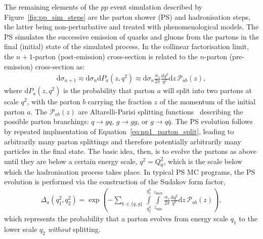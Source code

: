 The remaining elements of the $pp$ event simulation described by Figure~\ref{fig:pp_sim_steps} are the parton shower (PS)
and hadronisation steps, the latter being non-perturbative and treated with phenomenological models.
The PS simulates the successive emission of quarks and gluons from the partons in the final (initial) state of the
simulated process.
In the collinear factorisation limit, the $n+1$-parton (post-emission) cross-section is related to the $n$-parton (pre-emission) cross-section
as:
\begin{align}
    \mathrm{d}\sigma_{n+1} \approx \mathrm{d}\sigma_n \mathrm{d}P_a(z, q^2) \approx \mathrm{d}\sigma_n \frac{\alpha_s}{2\pi} \frac{\mathrm{d}q^2}{q^2} \mathrm{d}z \, \mathcal{P}_{ab}(z),
    \label{eq:np1_parton_split}
\end{align}
where $\mathrm{d}P_a(z,q^2)$ is the probability that parton $a$ will split into two partons at scale $q^2$, with the parton $b$ carrying the
fraction $z$ of the momentum of the initial parton $a$.
The $\mathcal{P}_{ab}(z)$ are Altarelli-Parisi splitting functions~\cite{Altarelli:1977zs} describing the possible parton branchings: $q \rightarrow gq$, $g \rightarrow gg$, 
or $g \rightarrow q\bar{q}$.
The PS evolution follows by repeated implmentation of Equation~\ref{eq:np1_parton_split}, leading to arbitrarily many
parton splittings and therefore potentially arbitrarily many particles in the final state.
The basic idea, then, is to evolve the partons as above until they are below a certain energy scale, $q^2 = Q_0^2$, which is the scale
below which the hadronisation process takes place.
In typical PS MC programs, the PS evolution is performed via the construction of the Sudakov form factor,
\begin{align}
    \Delta_{a}(q_1^2, q_2^2) = \exp \left ( - \sum\limits_{b\, \in \{q,g\}} \, \int\limits_{q_2^2}^{q_1^2} \int\limits_{z_{\text{min}}}^{z_{\text{max}}} \frac{\alpha_s}{2\pi} \frac{\mathrm{d}q^2}{q^2} \mathrm{d}z \, \mathcal{P}_{ab}(z) \right),
    \label{eq:sudakov_form_factor}
\end{align}
which represents the probability that a parton evolves from energy scale $q_1$ to the lower scale $q_2$ \textit{without} splitting.

